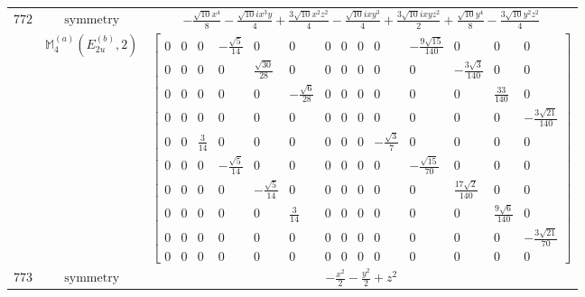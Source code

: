 \documentclass[fleqn,8pt,landscape]{jsarticle}
\begin{document}
\begin{longtable}{ccc}
$ 772 $ & $ \text{symmetry} $ & $ - \frac{\sqrt{10} x^{4}}{8} - \frac{\sqrt{10} i x^{3} y}{4} + \frac{3 \sqrt{10} x^{2} z^{2}}{4} - \frac{\sqrt{10} i x y^{3}}{4} + \frac{3 \sqrt{10} i x y z^{2}}{2} + \frac{\sqrt{10} y^{4}}{8} - \frac{3 \sqrt{10} y^{2} z^{2}}{4} $ \\
$  $ & $ \mathbb{M}_{4}^{(a)}(E_{2u}^{(b)},2) $ & $ \begin{bmatrix} 0 & 0 & 0 & - \frac{\sqrt{5}}{14} & 0 & 0 & 0 & 0 & 0 & 0 & - \frac{9 \sqrt{15}}{140} & 0 & 0 & 0 \\ 0 & 0 & 0 & 0 & \frac{\sqrt{30}}{28} & 0 & 0 & 0 & 0 & 0 & 0 & - \frac{3 \sqrt{3}}{140} & 0 & 0 \\ 0 & 0 & 0 & 0 & 0 & - \frac{\sqrt{6}}{28} & 0 & 0 & 0 & 0 & 0 & 0 & \frac{33}{140} & 0 \\ 0 & 0 & 0 & 0 & 0 & 0 & 0 & 0 & 0 & 0 & 0 & 0 & 0 & - \frac{3 \sqrt{21}}{140} \\ 0 & 0 & \frac{3}{14} & 0 & 0 & 0 & 0 & 0 & 0 & - \frac{\sqrt{3}}{7} & 0 & 0 & 0 & 0 \\ 0 & 0 & 0 & - \frac{\sqrt{5}}{14} & 0 & 0 & 0 & 0 & 0 & 0 & - \frac{\sqrt{15}}{70} & 0 & 0 & 0 \\ 0 & 0 & 0 & 0 & - \frac{\sqrt{5}}{14} & 0 & 0 & 0 & 0 & 0 & 0 & \frac{17 \sqrt{2}}{140} & 0 & 0 \\ 0 & 0 & 0 & 0 & 0 & \frac{3}{14} & 0 & 0 & 0 & 0 & 0 & 0 & \frac{9 \sqrt{6}}{140} & 0 \\ 0 & 0 & 0 & 0 & 0 & 0 & 0 & 0 & 0 & 0 & 0 & 0 & 0 & - \frac{3 \sqrt{21}}{70} \\ 0 & 0 & 0 & 0 & 0 & 0 & 0 & 0 & 0 & 0 & 0 & 0 & 0 & 0 \end{bmatrix} $ \\ \hline
$ 773 $ & $ \text{symmetry} $ & $ - \frac{x^{2}}{2} - \frac{y^{2}}{2} + z^{2} $ \\

\end{longtable}
\end{document}
